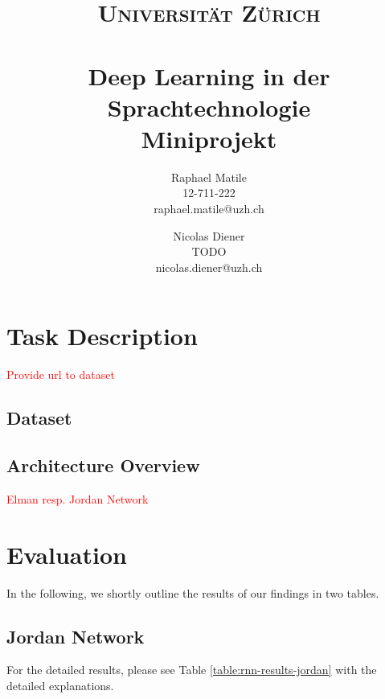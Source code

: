 \documentclass[a4paper]{article}
\title{
\normalfont \normalsize
\textsc{Universität Zürich} \\ [25pt]
\horrule{0.5pt} \\[0.4cm]
\huge Deep Learning in der Sprachtechnologie\\[0.3cm]
\small Miniprojekt
\horrule{2pt} \\[0.5cm]
}
\author{
  Raphael Matile \\ 12-711-222 \\ raphael.matile@uzh.ch 
  \and
  Nicolas Diener \\ TODO \\ nicolas.diener@uzh.ch
}
\begin{document}
\maketitle

\section{Task Description}
\textcolor{red}{Provide url to dataset}
\subsection{Dataset}

\subsection{Architecture Overview}
\textcolor{red}{Elman resp. Jordan Network}

\section{Evaluation}
In the following, we shortly outline the results of our findings in two tables.

\subsection{Jordan Network}
For the detailed results, please see Table \ref{table:rnn-results-jordan} with the detailed explanations.
\end{document}
